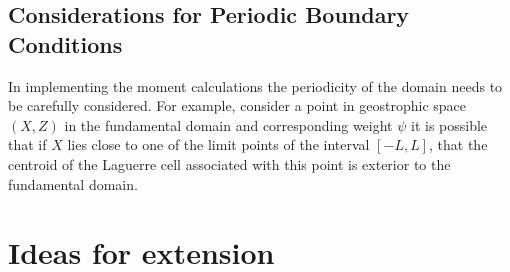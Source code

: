 \subsection{Considerations for Periodic Boundary Conditions}
In implementing the moment calculations the periodicity of the domain needs to be carefully considered. For example, consider a point in geostrophic space $\left(X, Z\right)$ in the fundamental domain and corresponding weight $\psi$ it is possible that if $X$ lies close to one of the limit points of the interval $[-L,L]$, that the centroid of the Laguerre cell associated with this point is exterior to the fundamental domain.
\section{Ideas for extension}
